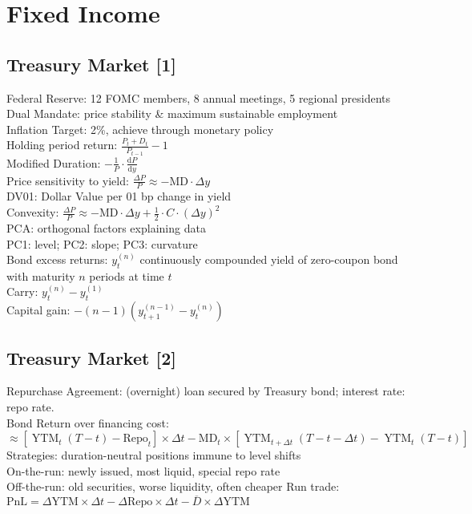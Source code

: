 \section{Fixed Income}
	\subsection*{Treasury Market [1]}
	Federal Reserve: 12 FOMC members, 8 annual meetings, 5 regional presidents\\
	Dual Mandate: price stability \& maximum sustainable employment\\
	Inflation Target: 2\%, achieve through monetary policy\\
	Holding period return: $\frac{P_{t} + D_{t}}{P_{t-1}} - 1$\\
	Modified Duration: $-\frac{1}{P}\cdot\frac{\mathrm{d}P}{\mathrm{d}y}$\\
	Price sensitivity to yield: $\frac{\Delta P}{P}\approx -\text{MD}\cdot\Delta y$\\
	DV01: Dollar Value per 01 bp change in yield\\
	Convexity: $\frac{\Delta P}{P}\approx -\text{MD}\cdot\Delta y + \frac{1}{2}\cdot C\cdot\left(\Delta y\right)^{2}$\\
	PCA: orthogonal factors explaining data\\
	PC1: level; PC2: slope; PC3: curvature\\
	Bond excess returns: $y_{t}^{(n)}$ continuously compounded yield of zero-coupon bond with maturity $n$ periods at time $t$\\
	Carry: $y_{t}^{(n)} - y_{t}^{(1)}$\\
	Capital gain: $-\left(n - 1\right)\left(y_{t+1}^{(n-1)} - y_{t}^{(n)}\right)$
	
	\subsection*{Treasury Market [2]}
	Repurchase Agreement: (overnight) loan secured by Treasury bond; interest rate: repo rate.\\
	Bond Return over financing cost: $\approx\left[\operatorname{YTM}_{t}\left(T - t\right) - \text{Repo}_{t}\right]\times\Delta t - \text{MD}_{t}\times\left[\operatorname{YTM}_{t+\Delta t}\left(T - t - \Delta t\right) - \operatorname{YTM}_{t}\left(T - t\right)\right]$\\
	Strategies: duration-neutral positions immune to level shifts\\
	On-the-run: newly issued, most liquid, special repo rate\\
	Off-the-run: old securities, worse liquidity, often cheaper
	Run trade: $\text{PnL} = \Delta\text{YTM}\times\Delta t - \Delta\text{Repo}\times\Delta t - \overline{D}\times\Delta\text{YTM}$
	
